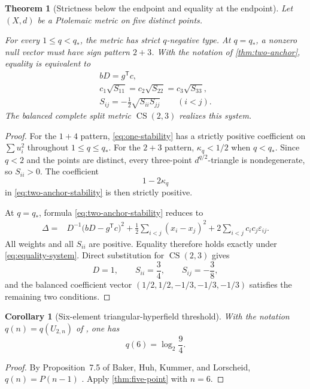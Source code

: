 \documentclass[11pt]{amsart}
\newtheorem{theorem}{Theorem}[section]
\newtheorem{corollary}[corollary]{Corollary}
\theoremstyle{definition}
\theoremstyle{remark}
\newcommand{\CS}{\operatorname{CS}}
\newcommand{\qstar}{q_*}
\begin{document}
\begin{theorem}[Strictness below the endpoint and equality at the endpoint]\label{thm:five-point-stability}
Let $(X,d)$ be a Ptolemaic metric on five distinct points.

For every $1\le q<\qstar$, the metric has strict $q$-negative type. At $q=\qstar$, a nonzero null vector must have sign pattern $2+3$. With the notation of \cref{thm:two-anchor}, equality is equivalent to
\begin{equation}\label{eq:equality-system}
 \begin{gathered}
 bD=g^{\mathsf T}c,\\
 c_1\sqrt{S_{11}}=c_2\sqrt{S_{22}}=c_3\sqrt{S_{33}},\\
 S_{ij}=-\frac12\sqrt{S_{ii}S_{jj}}\qquad(i<j).
 \end{gathered}
\end{equation}
The balanced complete split metric $\CS(2,3)$ realizes this system.
\end{theorem}

\begin{proof}
For the $1+4$ pattern, \eqref{eq:one-stability} has a strictly positive coefficient on $\sum u_i^2$ throughout $1\le q\le\qstar$. For the $2+3$ pattern, $\kappa_q<1/2$ when $q<\qstar$. Since $q<2$ and the points are distinct, every three-point $d^{q/2}$-triangle is nondegenerate, so $S_{ii}>0$. The coefficient
\[
 1-2\kappa_q
\]
in \eqref{eq:two-anchor-stability} is then strictly positive.

At $q=\qstar$, formula \eqref{eq:two-anchor-stability} reduces to
\begin{align*}
 \Delta={}&D^{-1}\bigl(bD-g^{\mathsf T}c\bigr)^2
 +\frac12\sum_{i<j}(x_i-x_j)^2
 +2\sum_{i<j}c_ic_j\varepsilon_{ij}.
\end{align*}
All weights and all $S_{ii}$ are positive. Equality therefore holds exactly under \eqref{eq:equality-system}. Direct substitution for $\CS(2,3)$ gives
\[
 D=1,
 \qquad
 S_{ii}=\frac34,
 \qquad
 S_{ij}=-\frac38,
\]
and the balanced coefficient vector $(1/2,1/2,-1/3,-1/3,-1/3)$ satisfies the remaining two conditions.
\end{proof}

\begin{corollary}[Six-element triangular-hyperfield threshold]\label{cor:q6}
With the notation $q(n)=q(U_{2,n})$ of \cite{BHKL}, one has
\[
 \boxed{q(6)=\log_2\frac94.}
\]
\end{corollary}

\begin{proof}
By Proposition~7.5 of Baker, Huh, Kummer, and Lorscheid, $q(n)=P(n-1)$ \cite{BHKL}. Apply \cref{thm:five-point} with $n=6$.
\end{proof}
\end{document}

